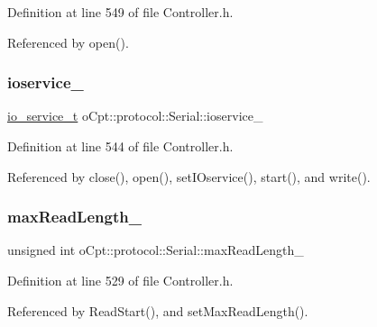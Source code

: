 Definition at line 549 of file Controller.\+h.



Referenced by open().

\hypertarget{classo_cpt_1_1protocol_1_1_serial_a313201e80bdb7495b837960c16d244a2}{}\label{classo_cpt_1_1protocol_1_1_serial_a313201e80bdb7495b837960c16d244a2} 
\subsubsection{\texorpdfstring{ioservice\+\_\+}{ioservice\_}}
{\footnotesize\ttfamily \hyperlink{classo_cpt_1_1protocol_1_1_serial_ac9305799ef4be4eb50f1274184492f04}{io\+\_\+service\+\_\+t} o\+Cpt\+::protocol\+::\+Serial\+::ioservice\+\_\+\hspace{0.3cm}{\ttfamily [protected]}}



Definition at line 544 of file Controller.\+h.



Referenced by close(), open(), set\+I\+Oservice(), start(), and write().

\hypertarget{classo_cpt_1_1protocol_1_1_serial_a944ac0bfaeea6bd223ef736f1e9e318c}{}\label{classo_cpt_1_1protocol_1_1_serial_a944ac0bfaeea6bd223ef736f1e9e318c} 
\subsubsection{\texorpdfstring{max\+Read\+Length\+\_\+}{maxReadLength\_}}
{\footnotesize\ttfamily unsigned int o\+Cpt\+::protocol\+::\+Serial\+::max\+Read\+Length\+\_\+\hspace{0.3cm}{\ttfamily [protected]}}



Definition at line 529 of file Controller.\+h.



Referenced by Read\+Start(), and set\+Max\+Read\+Length().

\hypertarget{classo_cpt_1_1protocol_1_1_serial_a418ed31316844cd2ea8bc6edd89e9619}{}\label{classo_cpt_1_1protocol_1_1_serial_a418ed31316844cd2ea8bc6edd89e9619} 
